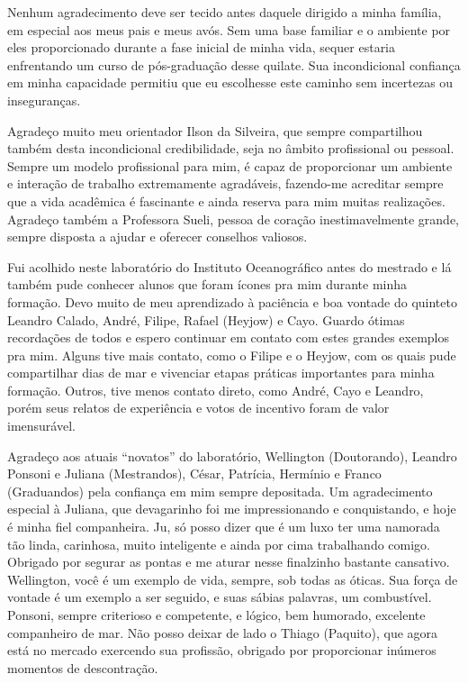 \hspace{6mm} Nenhum agradecimento deve ser tecido antes daquele dirigido a 
minha família, em especial aos meus pais e meus avós. Sem uma base familiar e o 
ambiente por eles proporcionado durante a fase inicial de minha vida, sequer
estaria enfrentando um curso de pós-graduação desse quilate. Sua incondicional confiança em
minha capacidade permitiu que eu escolhesse este caminho sem incertezas ou inseguranças. 

Agradeço muito meu orientador Ilson da Silveira, que sempre compartilhou tam\-bém desta 
incondicional credibilidade, seja no âmbito profissional ou pessoal. Sempre um modelo
profissional para mim, é capaz de proporcionar um ambiente e interação de trabalho extremamente
agradáveis, fazendo-me acreditar sempre que a vida a\-ca\-dê\-mi\-ca é fascinante e ainda reserva para mim muitas
realizações. Agradeço também a Professora Sueli, pessoa de coração inestimavelmente grande, sempre
disposta a ajudar e oferecer conselhos valiosos. 

Fui acolhido neste laboratório do Instituto Oceanográfico antes do mestrado e lá também pude conhecer alunos
que foram ícones pra mim durante minha formação. Devo muito de meu aprendizado à paciência e 
boa vontade do quinteto Leandro Calado, André, Filipe, Rafael (Heyjow) e Cayo. Guardo ótimas
recordações de todos e espero continuar em contato com estes grandes exemplos pra mim. Alguns tive
mais contato, como o Filipe e o Heyjow, com os quais pude compartilhar dias de mar e vivenciar 
etapas práticas importantes para minha formação. Outros, tive menos contato direto, como André,
Cayo e Leandro, porém seus relatos de experiência e votos de incentivo foram de valor imensurável.

Agradeço aos atuais ``novatos'' do laboratório, Wellington (Doutorando), Leandro Ponsoni e Juliana (Mestrandos), César, Patrícia, 
Hermínio e Franco (Graduandos) pela confiança em mim sempre depositada.
Um agradecimento especial à Juliana, que devagarinho foi me impressionando e conquistando, e hoje é minha fiel companheira.
Ju, só posso dizer que é um luxo ter uma namorada tão linda, carinhosa, muito inteligente e ainda por cima
trabalhando comigo. Obrigado por segurar as pontas e me aturar nesse finalzinho bastante cansativo.
Wellington, você é um exemplo de vida, sempre, 
sob todas as óticas. Sua força de vontade é um exemplo a ser seguido, e suas sábias palavras, um combustível. Ponsoni, sempre
criterioso e competente, e lógico, bem humorado, excelente companheiro de mar. 
Não posso deixar de lado o Thiago (Paquito), que agora está no mercado exercendo sua profissão, 
obrigado por proporcionar inúmeros momentos de descontração.

